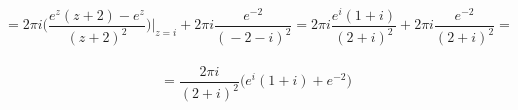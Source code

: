 \documentclass[12pt, a4paper]{article}
\begin{document}
\paragraph{}
\begin{equation*}
   = 2\pi i\Bigg(\frac{e^z(z+2)-e^z}{(z+2)^2}\Bigg)\Bigg|_{z=i} +  2\pi i\frac{e^{\big-2}}{(\big-2\big-i)^2} = 2\pi i\frac{e^i(1+i)}{(2+i)^2} + 2\pi i\frac{e^{\big-2}}{(2+i)^2} = 
\end{equation*}
\paragraph{}
\begin{equation*}
  = \frac{2\pi i}{(2+i)^2} \Big(e^i(1+i)+e^{\big-2}\Big)
\end{equation*}
\end{document}
